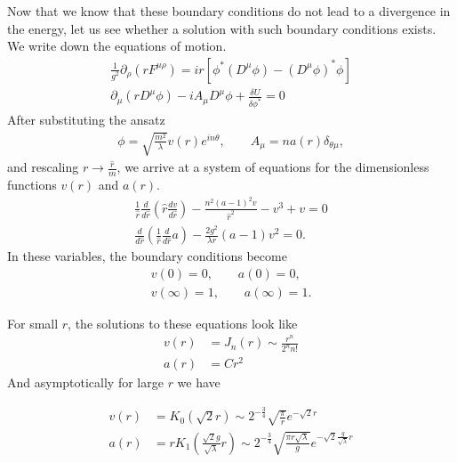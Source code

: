     Now that we know that these boundary conditions do not lead to a divergence in the energy, let us see whether a solution with such boundary conditions exists. We write down the equations of motion.
    \begin{align}
        \frac{1}{g^2}  \partial_{\rho}(r F^{\mu \rho}) = i r \left[\phi^* \left(D^{\mu}\phi\right) - \left(D^{\mu}\phi \right)^* \phi \right] \nonumber \\
        \partial_{\mu} \left(r D^{\mu} \phi \right) - i A_{\mu} D^{\mu} \phi + \frac{\delta U}{\delta \phi^*} =0
    \end{align}
    After substituting the ansatz
    \begin{align}
        \phi = \sqrt{\frac{m^2}{\lambda}}v(r) e^{i n \theta}, \qquad A_{\mu} = n a(r) \delta_{\theta \mu},
    \end{align}
    and rescaling $r\rightarrow \frac{\hat{r}}{m}$, we arrive at a system of equations for the dimensionless functions $v(r)$ and $a(r)$.
    \begin{align}
        \frac{1}{\hat{r}} \frac{d }{d \hat{r}} \left(\hat{r} \frac{d v}{d \hat{r}} \right) - \frac{n^2 (a-1)^2 v}{\hat{r}^2} -v^3 +v =0  \\
        \frac{d}{d \hat{r}}\left(\frac{1}{\hat{r}}\frac{d}{d \hat{r}} a \right)- \frac{2 g^2}{\lambda r} (a-1)v^2=0.
    \end{align}
    In these variables, the boundary conditions become
    \begin{align}
        v(0) = 0, \qquad a(0)=0, \\
        v(\infty) =1, \qquad a(\infty) =1.
    \end{align}


    For small $r$, the solutions to these equations look like
    \begin{align}
        v(r)&= J_n(r) \sim \frac{r^n}{ 2^n n!} \\
        a(r)&= C r^2
    \end{align}
    And asymptotically for large $r$ we have

    \begin{align}
        v(r)&=K_0\left(\sqrt{2} r\right)\sim 2^{-\frac{3}{4}}\sqrt{\frac{\pi}{r}} e^{- \sqrt{2} r} \\
        a(r)&=r K_1\left(\frac{\sqrt{2} g}{\sqrt{\lambda}} r \right)\sim 2^{- \frac{3}{4}} \sqrt{\frac{\pi r \sqrt{\lambda}}{g}} e^{- \sqrt{2} \frac{g}{\sqrt{\lambda}}r}
    \end{align}

